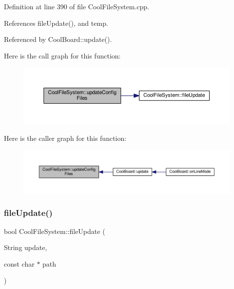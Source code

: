 Definition at line 390 of file Cool\+File\+System.\+cpp.



References file\+Update(), and temp.



Referenced by Cool\+Board\+::update().

Here is the call graph for this function\+:
\nopagebreak
\begin{figure}[H]
\begin{center}
\leavevmode
\includegraphics[width=350pt]{db/d0c/class_cool_file_system_adfa8e2e80641ae6f0cceabd348a9b841_cgraph}
\end{center}
\end{figure}
Here is the caller graph for this function\+:
\nopagebreak
\begin{figure}[H]
\begin{center}
\leavevmode
\includegraphics[width=350pt]{db/d0c/class_cool_file_system_adfa8e2e80641ae6f0cceabd348a9b841_icgraph}
\end{center}
\end{figure}
\mbox{\label{class_cool_file_system_a13f2958f5b87757c31fc53797a30d23a}} 
\subsubsection{\texorpdfstring{file\+Update()}{fileUpdate()}}
{\footnotesize\ttfamily bool Cool\+File\+System\+::file\+Update (\begin{DoxyParamCaption}\item[{String}]{update,  }\item[{const char $\ast$}]{path }\end{DoxyParamCaption})}

